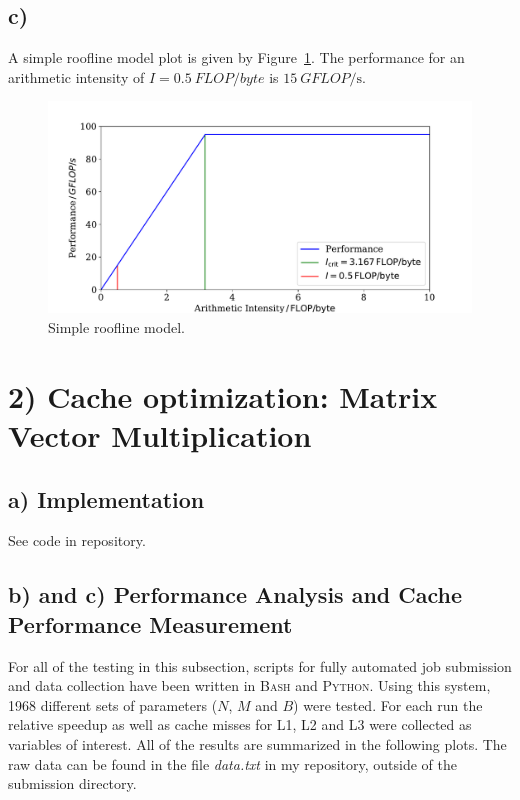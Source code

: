 \documentclass[a4paper, 11pt]{article}
\begin{document}
\newpage
\subsection*{c)}
A simple roofline model plot is given by Figure~\ref{fig:roofline}. The
performance for an arithmetic intensity of $I = \SI{0.5}{FLOP\per byte}$ is
$\SI{15}{GFLOP\per\second}$.
\begin{figure}
  \centering
  \includegraphics[width=\textwidth]{../plot/roofline.pdf}
  \caption{Simple roofline model.}
  \label{fig:roofline}
\end{figure}

\section*{2) Cache optimization: Matrix Vector Multiplication}

\subsection*{a) Implementation}
See code in repository.

\subsection*{b) and c) Performance Analysis and Cache Performance Measurement}
For all of the testing in this subsection, scripts for fully automated job
submission and data collection have been written in \textsc{Bash} and
\textsc{Python}. Using this system, 1968 different sets of parameters ($N$,
$M$ and $B$) were tested. For each run the relative speedup as well as cache
misses for L1, L2 and L3 were collected as variables of interest. All of the
results are summarized in the following plots. The raw data can be found in the
file \textit{data.txt} in my repository, outside of the submission directory.
\end{document}
